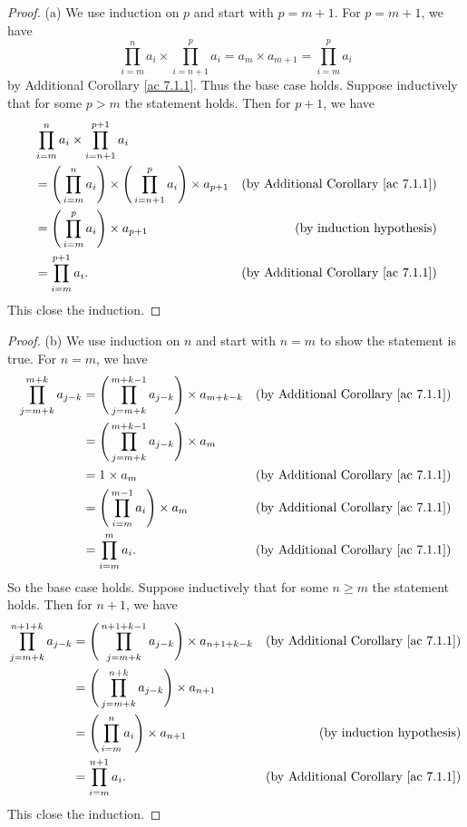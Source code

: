 \begin{proof}{(a)}
We use induction on \(p\) and start with \(p = m + 1\).
For \(p = m + 1\), we have
\[
    \prod_{i = m}^n a_i \times \prod_{i = n + 1}^p a_i = a_m \times a_{m + 1} = \prod_{i = m}^p a_i
\]
by Additional Corollary \ref{ac 7.1.1}.
Thus the base case holds.
Suppose inductively that for some \(p > m\) the statement holds.
Then for \(p + 1\), we have
\begin{align*}
& \prod_{i = m}^n a_i \times \prod_{i = n + 1}^{p + 1} a_i \\
&= \Bigg(\prod_{i = m}^n a_i\Bigg) \times \Bigg(\prod_{i = n + 1}^p a_i\Bigg) \times a_{p + 1} & \text{(by Additional Corollary \ref{ac 7.1.1})} \\
&= \Bigg(\prod_{i = m}^p a_i\Bigg) \times a_{p + 1} & \text{(by induction hypothesis)} \\
&= \prod_{i = m}^{p + 1} a_i. & \text{(by Additional Corollary \ref{ac 7.1.1})}
\end{align*}
This close the induction.
\end{proof}

\begin{proof}{(b)}
We use induction on \(n\) and start with \(n = m\) to show the statement is true.
For \(n = m\), we have
\begin{align*}
\prod_{j = m + k}^{m + k} a_{j - k} &= \Bigg(\prod_{j = m + k}^{m + k - 1} a_{j - k}\Bigg) \times a_{m + k - k} & \text{(by Additional Corollary \ref{ac 7.1.1})} \\
&= \Bigg(\prod_{j = m + k}^{m + k - 1} a_{j - k}\Bigg) \times a_m \\
&= 1 \times a_m & \text{(by Additional Corollary \ref{ac 7.1.1})} \\
&= \Bigg(\prod_{i = m}^{m - 1} a_i\Bigg) \times a_m & \text{(by Additional Corollary \ref{ac 7.1.1})} \\
&= \prod_{i = m}^m a_i. & \text{(by Additional Corollary \ref{ac 7.1.1})}
\end{align*}
So the base case holds.
Suppose inductively that for some \(n \geq m\) the statement holds.
Then for \(n + 1\), we have
\begin{align*}
\prod_{j = m + k}^{n + 1 + k} a_{j - k} &= \Bigg(\prod_{j = m + k}^{n + 1 + k - 1} a_{j - k}\Bigg) \times a_{n + 1 + k - k} & \text{(by Additional Corollary \ref{ac 7.1.1})} \\
&= \Bigg(\prod_{j = m + k}^{n + k} a_{j - k}\Bigg) \times a_{n + 1} \\
&= \Bigg(\prod_{i = m}^n a_i\Bigg) \times a_{n + 1} & \text{(by induction hypothesis)} \\
&= \prod_{i = m}^{n + 1} a_i. & \text{(by Additional Corollary \ref{ac 7.1.1})}
\end{align*}
This close the induction.
\end{proof}

